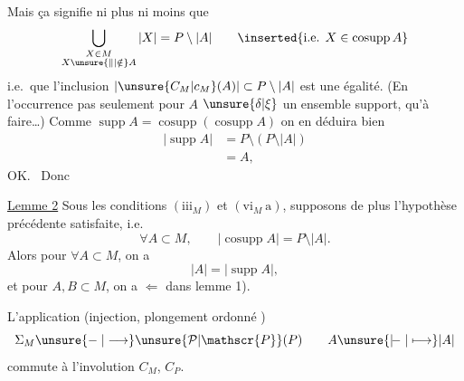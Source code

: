 
Mais ça signifie ni plus ni moins que
\[
\bigcup_{\substack{X\in M\\X\unsure{\parallel|\notin}A}}|X|=P\setminus|A|
\qquad\inserted{\text{i.e. }X\in\operatorname{cosupp}A}
\]
i.e.\ que l'inclusion $|\unsure{C_M|c_M}(A)|\subset P\setminus|A|$ est une égalité. (En l'occurrence pas seulement pour $A$ $\unsure{\delta|\xi}$ un ensemble support,  qu'à faire\ldots) Comme $\operatorname{supp}A=\operatorname{cosupp}(\operatorname{cosupp}A)$ on en déduira bien
\[
\begin{aligned}
|\operatorname{supp}A|&=P\setminus(P\setminus|A|)\\
&=A,
\end{aligned}
\]
OK.\  Donc

\uline{Lemme 2} Sous les conditions $(\mathrm{iii}_M)$ et $(\mathrm{vi}_M\ \text{a})$, supposons de plus l'hypothèse précédente satisfaite, i.e.
\[
\forall A\subset M,\qquad |\operatorname{cosupp}A|=P\setminus|A|.
\]
Alors pour $\forall A\subset M$, on a
\[
|A|=|\operatorname{supp}A|,
\]
et pour $A,B\subset M$, on a
 $\Longleftarrow$  dans lemme 1).

L'application (injection, plongement ordonné )
\[
\Sigma_M\unsure{\mathrel{-}|\longrightarrow}\unsure{\mathcal{P}|\mathscr{P}}(P)
\qquad A\unsure{\mathrel{\vert\!{-}}|\longmapsto}|A|
\]
commute à l'involution $C_M$, $C_P$.
